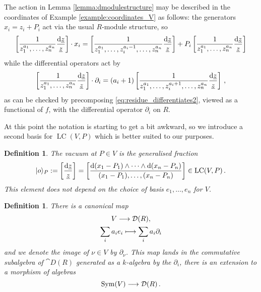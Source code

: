 \documentclass[english,letter paper,12pt,reqno]{article}
\DeclarePairedDelimiter\ket{\lvert}{\rangle}
\theoremstyle{example}
\newtheorem{definition}[theorem]{Definition}
\numberwithin{equation}{section}
\DeclareMathOperator{\Sym}{Sym}
\DeclareMathOperator{\LC}{LC}
\begin{document}
The action in Lemma \ref{lemma:dmodulestructure} may be described in the coordinates of Example \ref{example:coordinates_V} as follows: the generators $x_i = z_i + P_i$ act via the usual $R$-module structure, so
\begin{equation}
\left[ \frac{1}{z_1^{a_1}, \ldots, z_n^{a_n}} \frac{\operatorname{d}\!{\underline{z}}}{\underline{z}} \right] \cdot x_i = \left[ \frac{1}{z_1^{a_1}, \ldots, z_i^{a_i-1}, \ldots, z_n^{a_n}} \frac{\operatorname{d}\!{\underline{z}}}{\underline{z}} \right] + P_i \left[ \frac{1}{z_1^{a_1}, \ldots, z_n^{a_n}} \frac{\operatorname{d}\!{\underline{z}}}{\underline{z}} \right]
\end{equation}
while the differential operators act by
\begin{equation}\label{eq:action_diff_op}
\left[ \frac{1}{z_1^{a_1}, \ldots, z_n^{a_n}} \frac{\operatorname{d}\!{\underline{z}}}{\underline{z}} \right] \cdot \partial_i = (a_i + 1) \left[ \frac{1}{z_1^{a_1}, \ldots, z_i^{a_i+1}, \ldots, z_n^{a_n}} \frac{\operatorname{d}\!{\underline{z}}}{\underline{z}} \right]\,,
\end{equation}
as can be checked by precomposing \eqref{eq:residue_differentiates2}, viewed as a functional of $f$, with the differential operator $\partial_i$ on $R$. 

At this point the notation is starting to get a bit awkward, so we introduce a second basis for $\LC(V,P)$ which is better suited to our purposes.

\begin{definition} The \emph{vacuum} at $P \in V$ is the generalised fraction
\[
\ket{o}_P := \left[ \frac{\ud{\underline{z}}}{\underline{z}} \right] = \left[ \frac{\ud{(x_1-P_1)} \wedge \cdots \wedge \ud{(x_n - P_n)}}{(x_1-P_1), \ldots, (x_n-P_n)} \right] \in \LC(V,P)\,.
\]
This element does not depend on the choice of basis $e_1,\ldots,e_n$ for $V$.
\end{definition}

\begin{definition}\label{def:symvtoder} There is a canonical map
\begin{gather*}
V \longrightarrow \mathcal{D}(R),\\
\sum_i a_i e_i \longmapsto \sum_i a_i \partial_i
\end{gather*}
and we denote the image of $\nu \in V$ by $\partial_{\nu}$. This map lands in the commutative subalgebra of $\cat{D}(R)$ generated as a $k$-algebra by the $\partial_i$, there is an extension to a morphism of algebras
\begin{equation}\label{eq:symvtoder}
\Sym(V) \lto \cat{D}(R)\,.
\end{equation}
\end{definition}
\end{document}
